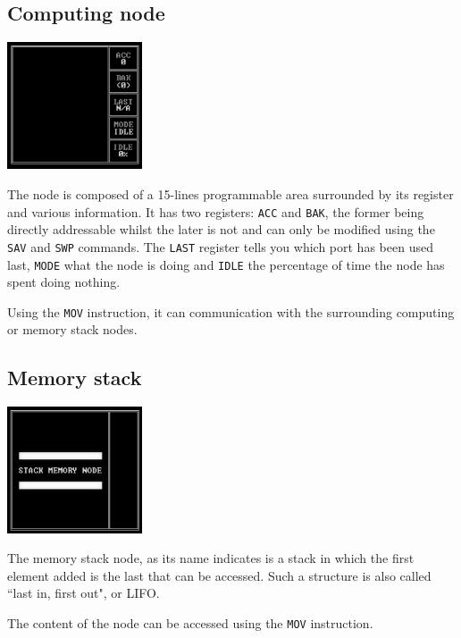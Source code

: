 \documentclass[10pt,a4paper]{article}
\theoremstyle{definition}%
\begin{document}
\subsection{Computing node}
\begin{center}
	\includegraphics[width=4cm]{computing-node.png}
\end{center}

The node is composed of a 15-lines programmable area surrounded by its register and various information.
It has two registers: \texttt{ACC} and \texttt{BAK}, the former being directly addressable whilst the later is not and can only be modified using the \texttt{SAV} and \texttt{SWP} commands.
The \texttt{LAST} register tells you which port has been used last, \texttt{MODE} what the node is doing and \texttt{IDLE} the percentage of time the node has spent doing nothing.

Using the \texttt{MOV} instruction, it can communication with the surrounding computing or memory stack nodes.



\subsection{Memory stack}
\begin{center}
	\includegraphics[width=4cm]{memory-stack-node.png}
\end{center}

The memory stack node, as its name indicates is a stack in which the first element added is the last that can be accessed.
Such a structure is also called ``last in, first out", or LIFO.

The content of the node can be accessed using the \texttt{MOV} instruction.
\end{document}
